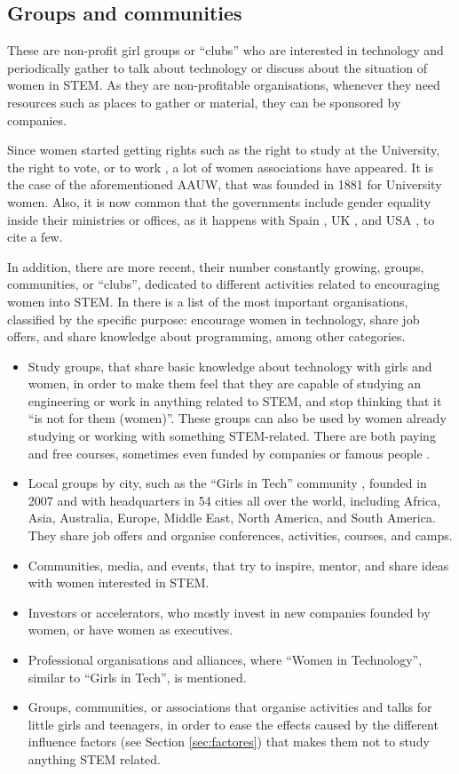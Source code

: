 \documentclass[journal,transmag]{IEEEtran}
\begin{document}
\subsection{Groups and communities}

These are non-profit girl groups or ``clubs'' who are interested in technology and periodically gather to talk about technology or discuss about the situation of women in STEM. As they are non-profitable organisations, whenever they need resources such as places to gather or material, they can be sponsored by companies.

Since women started getting rights such as the right to study at the University, the right to vote, or to work \cite{glover1995women}, a lot of women associations have appeared. It is the case of the aforementioned AAUW, that was founded in 1881 for University women. Also, it is now common that the governments include gender equality inside their ministries or offices, as it happens with Spain \cite{inmujer:site}, UK \cite{ukgequ:site}, and USA \cite{uswomen:site, aauw:site}, to cite a few.

In addition, there are more recent, their number constantly growing, groups, communities, or ``clubs'', dedicated to different activities related to encouraging women into STEM. In \cite{kira2012} there is a list of the most important organisations, classified by the specific purpose: encourage women in technology, share job offers, and share knowledge about programming, among other categories.

\begin{itemize}
	\item Study groups, that share basic knowledge about technology with girls and women, in order to make them feel that they are capable of studying an engineering or work in anything related to STEM, and stop thinking that it ``is not for them (women)''. These groups can also be used by women already studying or working with something STEM-related. There are both paying and free courses, sometimes even funded by companies or famous people \cite{karliek2012}.
	\item Local groups by city, such as the ``Girls in Tech'' community \cite{git:site}, founded in 2007 and with headquarters in 54 cities all over the world, including Africa, Asia, Australia, Europe, Middle East, North America, and South America. They share job offers and organise conferences, activities, courses, and camps.
	\item Communities, media, and events, that try to inspire, mentor, and share ideas with women interested in STEM.
	\item Investors or accelerators, who mostly invest in new companies founded by women, or have women as executives.
	\item Professional organisations and alliances, where ``Women in Technology'', similar to ``Girls in Tech'', is mentioned.
	\item Groups, communities, or associations that organise activities and talks for little girls and teenagers, in order to ease the effects caused by the different influence factors (see Section \ref{sec:factores}) that makes them not to study anything STEM related.
\end{itemize}
\end{document}
